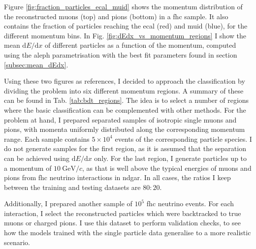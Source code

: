 Figure \ref{fig:fraction_particles_ecal_muid} shows the momentum distribution of the reconstructed muons (top) and pions (bottom) in a \gls{fhc} sample. It also contains the fraction of particles reaching the \gls{ecal} (red) and \gls{muid} (blue), for the different momentum bins. In Fig. \ref{fig:dEdx_vs_momentum_regions} I show the mean $\mathrm{d}E/\mathrm{d}x$ of different particles as a function of the momentum, computed using the \gls{aleph} parametrisation with the best fit parameters found in section \ref{subsec:mean_dEdx}.

Using these two figures as references, I decided to approach the classification by dividing the problem into six different momentum regions. A summary of these can be found in Tab. \ref{tab:bdt_regions}. The idea is to select a number of regions where the basic classification can be complemented with other methods. For the problem at hand, I prepared separated samples of isotropic single muons and pions, with momenta uniformly distributed along the corresponding momentum range. Each sample contains $5 \times 10^{4}$ events of the corresponding particle species. I do not generate samples for the first region, as it is assumed that the separation can be achieved using $\mathrm{d}E/\mathrm{d}x$ only. For the last region, I generate particles up to a momentum of $10~\mathrm{GeV}/c$, as that is well above the typical energies of muons and pions from \gls{fhc} neutrino interactions in \gls{ndgar}. In all cases, the ratios I keep between the training and testing datasets are $80:20$.

Additionally, I prepared another sample of $10^{5}$ \gls{fhc} neutrino events. For each interaction, I select the reconstructed particles which were backtracked to true muons or charged pions. I use this dataset to perform validation checks, to see how the models trained with the single particle data generalise to a more realistic scenario.

